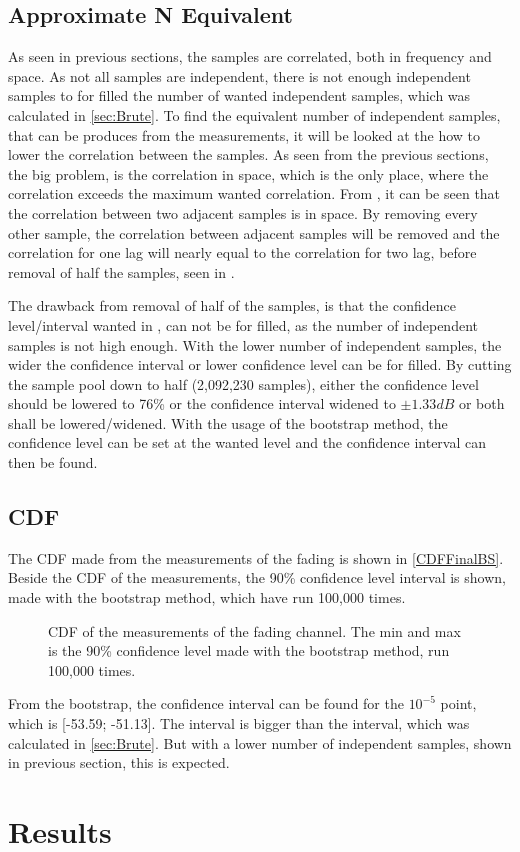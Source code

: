 \subsection{Approximate N Equivalent}


As seen in previous sections, the samples are correlated, both in frequency and space. As not all samples are independent, there is not enough independent samples to for filled the number of wanted independent samples, which was calculated in \autoref{sec:Brute}. To find the equivalent number of independent samples, that can be produces from the measurements, it will be looked at the how to lower the correlation between the samples. As seen from the previous sections, the big problem, is the correlation in space, which is the only place, where the correlation exceeds the maximum wanted correlation. From , it can be seen that the correlation between two adjacent samples is  in space. By removing every other sample, the correlation between adjacent samples will be removed and the correlation for one lag will nearly equal to the correlation for two lag, before removal of half the samples, seen in .


The drawback from removal of half of the samples, is that the confidence level/interval wanted in , can not be for filled, as the number of independent samples is not high enough. With the lower number of independent samples, the wider the confidence interval or lower confidence level can be for filled. By cutting the sample pool down to half (2,092,230 samples), either the confidence level should be lowered to 76\% or the confidence interval widened to $\pm 1.33dB$ or both shall be lowered/widened. With the usage of the bootstrap method, the confidence level can be set at the wanted level and the confidence interval can then be found.


\subsection{CDF}
The CDF made from the measurements of the fading is shown in \autoref{CDFFinalBS}. Beside the CDF of the measurements, the 90\% confidence level interval is shown, made with the bootstrap method, which have run 100,000 times.

\begin{figure}[H]


\caption{CDF of the measurements of the fading channel. The min and max is the 90\% confidence level made with the bootstrap method, run 100,000 times.}
\label{CDFFinalBS}
\end{figure}

From the bootstrap, the confidence interval can be found for the $10^{-5}$ point, which is [-53.59; -51.13]. The interval is bigger than the interval, which was calculated in \autoref{sec:Brute}. But with a lower number of independent samples, shown in previous section, this is expected.


\section{Results}